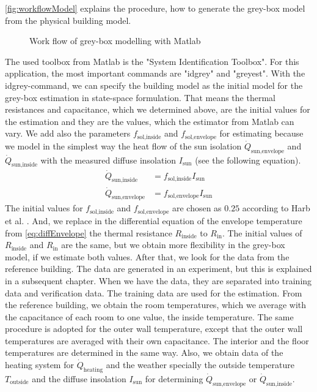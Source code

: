     \autoref{fig:workflowModel} explains the procedure, how to generate the grey-box model from the physical building model.\newline 
    \begin{figure}[h]
            \centering
            \def\svgwidth{400pt}
            
            \caption{Work flow of grey-box modelling with Matlab}
            \label{fig:workflowModel}
    \end{figure}
    The used toolbox from Matlab is the "System Identification Toolbox". For this application, the most important commands are "idgrey" and "greyest".
    With the idgrey-command, we can specify the building model as the initial model for the grey-box estimation in state-space formulation. That means the thermal resistances and capacitance, which we determined above, are the initial values for the estimation and they are the values, which the estimator from Matlab can vary.
    We add also the parameters $f_\text{sol,inside}$ and $f_\text{sol,envelope}$ for estimating because we model in the simplest way the heat flow of the sun isolation $\dot{Q}_\text{sun,envelope}$ and $\dot{Q}_\text{sun,inside}$ with the measured diffuse insolation $I_\text{sun}$ (see the following equation). 
    \begin{align}
       \label{eq:sun}
        \dot{Q}_\text{sun,inside} &= f_\text{sol,inside} I_\text{sun} \\
        \dot{Q}_\text{sun,envelope} &= f_\text{sol,envelope} I_\text{sun} \nonumber 
    \end{align}
    The initial values for $f_\text{sol,inside}$ and $f_\text{sol,envelope}$ are chosen as $0.25$ according to Harb et al. \cite{Harb.2016}. And, we replace in the differential equation of the envelope temperature from \autoref{eq:diffEnvelope} the thermal resistance $R_\text{inside}$ to $R_\text{in}$. The initial values of $R_\text{inside}$ and $R_\text{in}$ are the same, but we obtain more flexibility in the grey-box model, if we estimate both values.\newline
    After that, we look for the data from the reference building. The data are generated in an experiment, but this is explained in a subsequent chapter. When we have the data, they are separated into training data and verification data. The training data are used for the estimation. From the reference building, we obtain the room temperatures, which we average with the capacitance of each room to one value, the inside temperature. The same procedure is adopted for the outer wall temperature, except that the outer wall temperatures are averaged with their own capacitance. The interior and the floor temperatures are determined in the same way. Also, we obtain data of the heating system for $\dot{Q}_\text{heating}$ and the weather specially the outside temperature $T_\text{outside}$ and the diffuse insolation $I_\text{sun}$ for determining $\dot{Q}_\text{sun,envelope}$ or $\dot{Q}_\text{sun,inside}$. \newline
